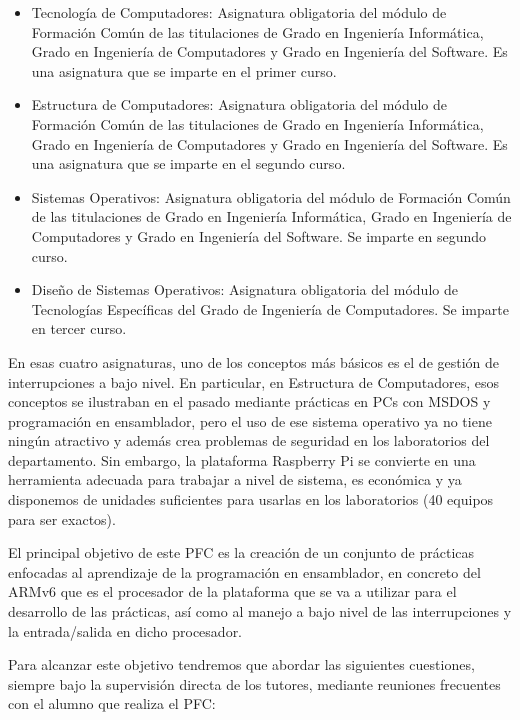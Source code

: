 \begin{sinopsis}
\begin{itemize}
  \item{Tecnología de Computadores:} Asignatura obligatoria del módulo de Formación
        Común de las titulaciones de Grado en Ingeniería Informática, Grado en
        Ingeniería de Computadores y Grado en Ingeniería del Software. Es una asignatura
        que se imparte en el primer curso.
  \item{Estructura de Computadores:} Asignatura obligatoria del módulo de Formación
        Común de las titulaciones de Grado en Ingeniería Informática, Grado en
        Ingeniería de Computadores y Grado en Ingeniería del Software. Es una asignatura
        que se imparte en el segundo curso.
  \item{Sistemas Operativos:} Asignatura obligatoria del módulo de Formación Común de las
        titulaciones de Grado en Ingeniería Informática, Grado en Ingeniería de
        Computadores y Grado en Ingeniería del Software. Se imparte en segundo curso.
  \item{Diseño de Sistemas Operativos:} Asignatura obligatoria del módulo de Tecnologías
        Específicas del Grado de Ingeniería de Computadores. Se imparte en tercer curso.
\end{itemize}

En esas cuatro asignaturas, uno de los conceptos más básicos es el de gestión de
interrupciones a bajo nivel. En particular, en Estructura de Computadores, esos
conceptos se ilustraban en el pasado mediante prácticas en PCs con MSDOS y programación
en ensamblador, pero el uso de ese sistema operativo ya no tiene ningún atractivo y
además crea problemas de seguridad en los laboratorios del departamento. Sin embargo,
la plataforma Raspberry Pi se convierte en una herramienta adecuada para trabajar a
nivel de sistema, es económica y ya disponemos de unidades suficientes para usarlas
en los laboratorios (40 equipos para ser exactos).
\end{sinopsis}
 
\label{sec:intro:obj}
El principal objetivo de este PFC es la creación de un conjunto de prácticas enfocadas
al aprendizaje de la programación en ensamblador, en concreto del ARMv6 que es el
procesador de la plataforma que se va a utilizar para el desarrollo de las prácticas,
así como al manejo a bajo nivel de las interrupciones y la entrada/salida en dicho procesador.

Para alcanzar este objetivo tendremos que abordar las siguientes cuestiones, siempre
bajo la supervisión directa de los tutores, mediante reuniones frecuentes con el alumno
que realiza el PFC:

